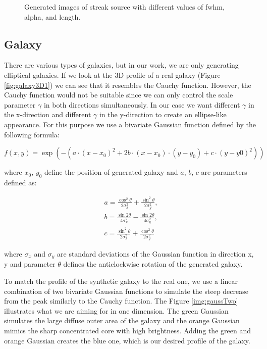 \begin{figure}[!h]
    \caption{Generated images of streak source with different values of fwhm, alpha, and length.}
    \label{fig:streakspar}
\end{figure}


\subsection{Galaxy}
There are various types of galaxies, but in our work, we are only generating elliptical galaxies. If we look at the 3D profile of a real galaxy (Figure \ref{fig:galaxy3D1}) we can see that it resembles the Cauchy function. However, the Cauchy function would not be suitable since we can only control the scale parameter $\gamma$ in both directions simultaneously. In our case we want different $\gamma$ in the x-direction and different $\gamma$ in the y-direction to create an ellipse-like appearance. For this purpose we use a bivariate Gaussian function defined by the following formula: 

\begin{equation} \label{eq:bigaus}
    f(x,y) = \exp \left(  - \left( a \cdot (x-x_0)^2 + 2b \cdot (x - x_0) \cdot (y - y_0) + c \cdot (y - y0)^2 \right)\right)
\end{equation}

where $x_0$, $y_0$ define the position of generated galaxy and $a$, $b$, $c$ are parameters defined as:

\begin{equation}
    \begin{split}
        a = \frac{\cos^2{\theta}}{2\sigma_x^2} + \frac{\sin^2{\theta}}{2\sigma_y^2}, \\
    b =  \frac{\sin{2\theta}}{4\sigma_x^2} - \frac{\sin{2\theta}}{4\sigma_y^2}, \\
    c = \frac{\sin^2{\theta}}{2\sigma_x^2} + \frac{\cos^2{\theta}}{2\sigma_y^2}
    \end{split}
\end{equation}

where $\sigma_x$ and $\sigma_y$ are standard deviations of the Gaussian function in direction x, y and parameter $\theta$ defines the anticlockwise rotation of the generated galaxy. 

To match the profile of the synthetic galaxy to the real one, we use a linear combination of two bivariate Gaussian functions to simulate the steep decrease from the peak similarly to the Cauchy function. The Figure \ref{img:gaussTwo} illustrates what we are aiming for in one dimension. The green Gaussian simulates the large diffuse outer area of the galaxy and the orange Gaussian mimics the sharp concentrated core with high brightness. Adding the green and orange Gaussian creates the blue one, which is our desired profile of the galaxy.

